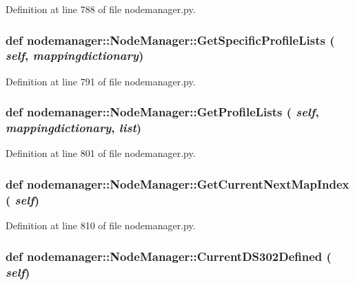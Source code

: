 Definition at line 788 of file nodemanager.py.\hypertarget{classnodemanager_1_1NodeManager_8f418509e43cc26670ef757c6854328b}{
\subsubsection[GetSpecificProfileLists]{\setlength{\rightskip}{0pt plus 5cm}def nodemanager::Node\-Manager::Get\-Specific\-Profile\-Lists ( {\em self},  {\em mappingdictionary})}}
\label{classnodemanager_1_1NodeManager_8f418509e43cc26670ef757c6854328b}




Definition at line 791 of file nodemanager.py.\hypertarget{classnodemanager_1_1NodeManager_26b88c9b0e6e72934ec591e8b974000c}{
\subsubsection[GetProfileLists]{\setlength{\rightskip}{0pt plus 5cm}def nodemanager::Node\-Manager::Get\-Profile\-Lists ( {\em self},  {\em mappingdictionary},  {\em list})}}
\label{classnodemanager_1_1NodeManager_26b88c9b0e6e72934ec591e8b974000c}




Definition at line 801 of file nodemanager.py.\hypertarget{classnodemanager_1_1NodeManager_2db6aadfa79b0b2a9cfd09e45b71f03c}{
\subsubsection[GetCurrentNextMapIndex]{\setlength{\rightskip}{0pt plus 5cm}def nodemanager::Node\-Manager::Get\-Current\-Next\-Map\-Index ( {\em self})}}
\label{classnodemanager_1_1NodeManager_2db6aadfa79b0b2a9cfd09e45b71f03c}




Definition at line 810 of file nodemanager.py.\hypertarget{classnodemanager_1_1NodeManager_5e8172882f6252e45bdb59f7248c83d6}{
\subsubsection[CurrentDS302Defined]{\setlength{\rightskip}{0pt plus 5cm}def nodemanager::Node\-Manager::Current\-DS302Defined ( {\em self})}}
\label{classnodemanager_1_1NodeManager_5e8172882f6252e45bdb59f7248c83d6}




